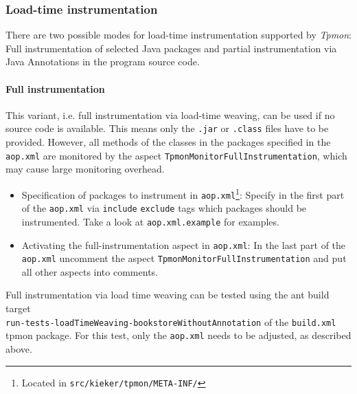 \documentclass[a4paper,12pt]{scrartcl}
\newcommand{\tpmon}{\textit{Tpmon}}
\begin{document}
% 
% 
\subsubsection{Load-time instrumentation}
There are two possible modes for load-time instrumentation supported by \tpmon:
 Full instrumentation of selected Java packages and partial instrumentation via Java Annotations
in the program source code.
\paragraph{Full instrumentation}
This variant, i.e. full instrumentation via load-time weaving, can be used if no source code is available. This means only the \texttt{.jar} or \texttt{.class} files have to be provided. However, all methods of the classes in the packages specified in the \texttt{aop.xml} are monitored by the aspect \texttt{TpmonMonitorFullInstrumentation}, which may cause large monitoring overhead.

\begin{itemize}
 \item Specification of packages to instrument in \texttt{aop.xml}\footnote{Located in \texttt{src/kieker/tpmon/META-INF/}}: Specify in the first part of the \texttt{aop.xml} via \texttt{include} \texttt{exclude} tags which packages should be instrumented. Take a look at  \texttt{aop.xml.example} for examples.
\item Activating the full-instrumentation aspect in \texttt{aop.xml}: In the last part of the \texttt{aop.xml} uncomment the aspect \texttt{TpmonMonitorFullInstrumentation} and put all other aspects into comments.
\end{itemize}

Full instrumentation via load time weaving can be tested using the ant build target \\ \small \texttt{run-tests-loadTimeWeaving-bookstoreWithoutAnnotation} \normalsize of the \texttt{build.xml} tpmon package. For this test, only the \texttt{aop.xml} needs to be adjusted, as described above.
\end{document}
